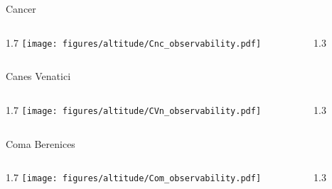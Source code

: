 \documentclass[final]{beamer}
\newlength{\colwidth}
\begin{document}

\begin{frame}[t]{}

    \Large{Cancer}
    \begin{columns}[T]
        \begin{column}{1.7\colwidth}
            \centering
            \texttt{[image: figures/altitude/Cnc\_observability.pdf]}
        \end{column}
        \begin{column}{1.3\colwidth}
            \Large
            
        \end{column}
    \end{columns}

    \Large{Canes Venatici}
    \begin{columns}[T]
        \begin{column}{1.7\colwidth}
            \centering
            \texttt{[image: figures/altitude/CVn\_observability.pdf]}
        \end{column}
        \begin{column}{1.3\colwidth}
            \Large
            
        \end{column}
    \end{columns}

    \Large{Coma Berenices}
    \begin{columns}[T]
        \begin{column}{1.7\colwidth}
            \centering
            \texttt{[image: figures/altitude/Com\_observability.pdf]}
        \end{column}
        \begin{column}{1.3\colwidth}
            \Large
            
        \end{column}
    \end{columns}
\end{frame}

\end{document}
